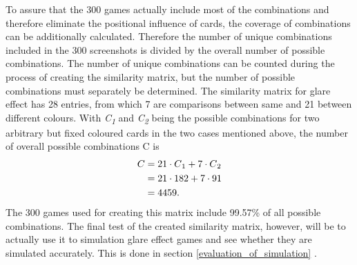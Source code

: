 To assure that the 300 games actually include most of the combinations and therefore eliminate the positional influence of cards, the coverage of combinations can be additionally calculated. Therefore the number of unique combinations included in the 300 screenshots is divided by the overall number of possible combinations. The number of unique combinations can be counted during the process of creating the similarity matrix, but the number of possible combinations must separately be determined. The similarity matrix for glare effect has 28 entries, from which 7 are comparisons between same and 21 between different colours. With \textit{C\textsubscript{1}} and \textit{C\textsubscript{2}}  being the possible combinations for two arbitrary but fixed coloured cards in the two cases mentioned above, the number of overall possible combinations C is
\begin{align*}
	C &= 21 \cdot C\textsubscript{1} + 7 \cdot C\textsubscript{2}\\
	&= 21 \cdot 182 + 7 \cdot 91\\
	&= 4459. 
\end{align*}
The 300 games used for creating this matrix include 99.57\% of all possible combinations. The final test of the created similarity matrix, however, will be to actually use it to simulation glare effect games and see whether they are simulated accurately. This is done in section \ref{evaluation_of_simulation} . 


\newpage

